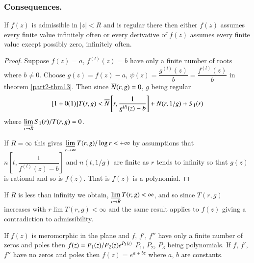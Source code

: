 \subsubsection{Consequences.}\label{part2-subsubsec2.5.3}

\begin{thm}[Milloux]\label{part2-thm14}
If $f(z)$ is admissible in $|z|<R$ and is regular there then either
$f(z)$ assumes every finite value infinitely often or every derivative
of $f(z)$ assumes every finite value except possibly zero, infinitely often.
\end{thm}

\begin{proof}
Suppose $f(z)=a$, $f^{(l)}(z)=b$ have only a finite number of roots
where $b\neq 0$. Choose $g(z)=f(z)-a$,
$\psi(z)=\dfrac{g^{(l)}(z)}{b}=\dfrac{f^{(l)}(z)}{b}$ in\pageoriginale
theorem \ref{part2-thm13}. Then since $\overline{N}(r,g)=0$, $g$ being
regular
$$
[1+0(1)]T(r,g)<\overline{N}\left[r,\frac{1}{g^{(l)}(z)-b}\right]+N(r,1/g)+S_{1}(r)
$$
where $\mathop{\underline{\lim}}\limits_{r\to R}S_{1}(r)/T(r,g)=0$.

If $R=\infty$ this gives $\mathop{\underline{\lim}}\limits_{r\to
  \infty}T(r,g)/\log r<+\infty$ by assumptions that
$n\left[t,\dfrac{1}{f^{(l)}(z)-b}\right]$ and $n(t,1/g)$ are finite as
$r$ tends to infinity so that $g(z)$ is rational and so is
$f(z)$. That is $f(z)$ is a polynomial.
\end{proof}

If $R$ is less than infinity we obtain,
$\mathop{\underline{\lim}}\limits_{r\to R}T(r,g)<\infty$, and so since
$T(r,g)$ increases with $r\lim T(r,g)<\infty$ and the same result
applies to $f(z)$ giving a contradiction to admissibility.

\begin{thm}[Saxer]\label{part2-thm15}
If $f(z)$ is meromorphic in the plane and $f$, $f'$, $f''$ have only a
finite number of zeros and poles then
$f(z)=P_{1}(z)/P_{2}(z)\break e^{P_{3}(z)}$  $P_{1}$, $P_{2}$, $P_{3}$ being
polynomials. If $f$, $f'$, $f''$ have no zeros and poles then
$f(z)=e^{a+bz}$ where $a$, $b$ are constants.
\end{thm}


